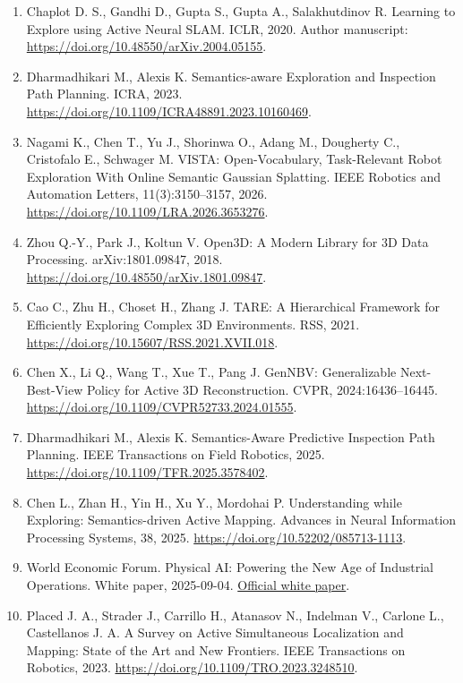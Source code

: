 \documentclass[11pt,a4paper]{article}
\begin{document}
\begin{enumerate}
\def\labelenumi{\arabic{enumi}.}
\item
  Chaplot D. S., Gandhi D., Gupta S., Gupta A., Salakhutdinov R. Learning to Explore using Active Neural SLAM. ICLR, 2020. Author manuscript: \url{https://doi.org/10.48550/arXiv.2004.05155}.
\item
  Dharmadhikari M., Alexis K. Semantics-aware Exploration and Inspection Path Planning. ICRA, 2023. \url{https://doi.org/10.1109/ICRA48891.2023.10160469}.
\item
  Nagami K., Chen T., Yu J., Shorinwa O., Adang M., Dougherty C., Cristofalo E., Schwager M. VISTA: Open-Vocabulary, Task-Relevant Robot Exploration With Online Semantic Gaussian Splatting. IEEE Robotics and Automation Letters, 11(3):3150--3157, 2026. \url{https://doi.org/10.1109/LRA.2026.3653276}.
\item
  Zhou Q.-Y., Park J., Koltun V. Open3D: A Modern Library for 3D Data Processing. arXiv:1801.09847, 2018. \url{https://doi.org/10.48550/arXiv.1801.09847}.
\item
  Cao C., Zhu H., Choset H., Zhang J. TARE: A Hierarchical Framework for Efficiently Exploring Complex 3D Environments. RSS, 2021. \url{https://doi.org/10.15607/RSS.2021.XVII.018}.
\item
  Chen X., Li Q., Wang T., Xue T., Pang J. GenNBV: Generalizable Next-Best-View Policy for Active 3D Reconstruction. CVPR, 2024:16436--16445. \url{https://doi.org/10.1109/CVPR52733.2024.01555}.
\item
  Dharmadhikari M., Alexis K. Semantics-Aware Predictive Inspection Path Planning. IEEE Transactions on Field Robotics, 2025. \url{https://doi.org/10.1109/TFR.2025.3578402}.
\item
  Chen L., Zhan H., Yin H., Xu Y., Mordohai P. Understanding while Exploring: Semantics-driven Active Mapping. Advances in Neural Information Processing Systems, 38, 2025. \url{https://doi.org/10.52202/085713-1113}.
\item
  World Economic Forum. Physical AI: Powering the New Age of Industrial Operations. White paper, 2025-09-04. \href{https://www.weforum.org/publications/physical-ai-powering-the-new-age-of-industrial-operations/}{Official white paper}.
\item
  Placed J. A., Strader J., Carrillo H., Atanasov N., Indelman V., Carlone L., Castellanos J. A. A Survey on Active Simultaneous Localization and Mapping: State of the Art and New Frontiers. IEEE Transactions on Robotics, 2023. \url{https://doi.org/10.1109/TRO.2023.3248510}.

\end{enumerate}
\end{document}
